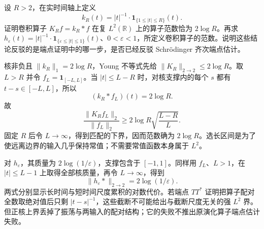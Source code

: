 \begin{exercise}\label{b2:ex:app-E-4}
设 \(R>2\)，在实时间轴上定义
\[
 k_R(t)=|t|^{-1}\cdot\mathbf1_{\{1\leq|t|\leq R\}}(t).
\]
证明卷积算子 \(K_Rf=k_R*f\) 在复 \(L^2(\mathbb R)\) 上的算子范数恰为 \(2\log R\)。再求
\(h_\varepsilon(t)=|t|^{-1}\cdot\mathbf1_{\{\varepsilon\leq|t|\leq1\}}(t)\)、\(0<\varepsilon<1\)，所定义卷积算子的范数。说明这些结论反驳的是端点证明中的哪一步，是否已经反驳 Schrödinger 齐次端点估计。
\end{exercise}
\begin{solution}
核非负且 \(\|k_R\|_1=2\log R\)，Young 不等式先给 \(\|K_R\|_{2\to2}\leq2\log R\)。取 \(L>R\) 并令 \(f_L=\mathbf1_{[-L,L]}\)。当 \(|t|\leq L-R\) 时，对核支撑内的每个 \(s\) 都有 \(t-s\in[-L,L]\)，所以
\[
 (k_R*f_L)(t)=2\log R.
\]
故
\[
 \frac{\|K_Rf_L\|_2}{\|f_L\|_2}
 \geq2\log R\sqrt{\frac{L-R}{L}}.
\]
固定 \(R\) 后令 \(L\to\infty\)，得到匹配的下界，因而范数确为 \(2\log R\)。选长区间是为了使远离边界的输入几乎保持常值；不需要常值函数本身属于 \(L^2\)。

对 \(h_\varepsilon\)，其质量为 \(2\log(1/\varepsilon)\)，支撑包含于 \([-1,1]\)。同样用 \(f_L\)、\(L>1\)，在 \(|t|\leq L-1\) 上取得全部核质量，再令 \(L\to\infty\)，得到
\[
 \|h_\varepsilon*\|_{2\to2}=2\log(1/\varepsilon).
\]
两式分别显示长时间与短时间尺度累积的对数代价。若端点 \(TT^*\) 证明把算子配对全数取绝对值后只剩 \(|t-s|^{-1}\)，这些截断不可能给出与截断尺度无关的强 \(L^2\) 界。但正核上界丢掉了振荡与两输入的配对结构；它的失败不推出原演化算子端点估计失败。
\end{solution}

